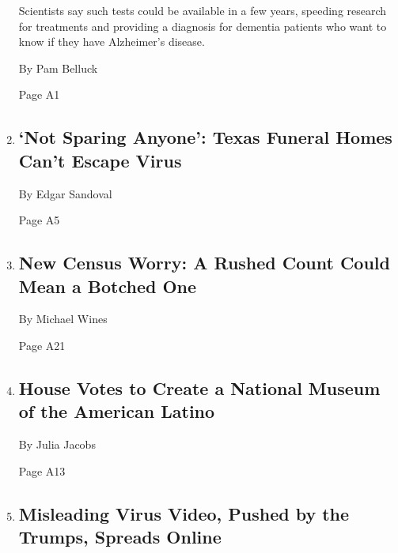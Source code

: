 \begin{enumerate}
  Scientists say such tests could be available in a few years, speeding
  research for treatments and providing a diagnosis for dementia
  patients who want to know if they have Alzheimer's disease.

  By Pam Belluck

  Page A1
\item
  \href{/2020/07/28/us/coronavirus-texas-funeral-homes.html}{}

  \hypertarget{not-sparing-anyone-texas-funeral-homes-cant-escape-virus}{%
  \subsection{`Not Sparing Anyone': Texas Funeral Homes Can't Escape
  Virus}\label{not-sparing-anyone-texas-funeral-homes-cant-escape-virus}}

  By Edgar Sandoval

  Page A5
\item
  \href{/2020/07/28/us/trump-census.html}{}

  \hypertarget{new-census-worry-a-rushed-count-could-mean-a-botched-one}{%
  \subsection{New Census Worry: A Rushed Count Could Mean a Botched
  One}\label{new-census-worry-a-rushed-count-could-mean-a-botched-one}}

  By Michael Wines

  Page A21
\item
  \href{/2020/07/28/arts/design/national-museum-of-the-american-latino.html}{}

  \hypertarget{house-votes-to-create-a-national-museum-of-the-american-latino}{%
  \subsection{House Votes to Create a National Museum of the American
  Latino}\label{house-votes-to-create-a-national-museum-of-the-american-latino}}

  By Julia Jacobs

  Page A13
\item
  \href{/2020/07/28/technology/virus-video-trump.html}{}

  \hypertarget{misleading-virus-video-pushed-by-the-trumps-spreads-online}{%
  \subsection{Misleading Virus Video, Pushed by the Trumps, Spreads
  Online}\label{misleading-virus-video-pushed-by-the-trumps-spreads-online}}


\end{enumerate}
